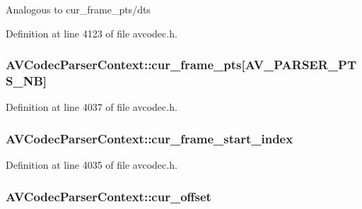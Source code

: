 Analogous to cur\+\_\+frame\+\_\+pts/dts 

Definition at line 4123 of file avcodec.\+h.

\subsubsection[{\texorpdfstring{cur\+\_\+frame\+\_\+pts}{cur_frame_pts}}]{ A\+V\+Codec\+Parser\+Context\+::cur\+\_\+frame\+\_\+pts\mbox{[}{\bf A\+V\+\_\+\+P\+A\+R\+S\+E\+R\+\_\+\+P\+T\+S\+\_\+\+NB}\mbox{]}}\hypertarget{struct_a_v_codec_parser_context_ab9dc35523fa27b36052b5ab984189ca2}{}\label{struct_a_v_codec_parser_context_ab9dc35523fa27b36052b5ab984189ca2}


Definition at line 4037 of file avcodec.\+h.

\subsubsection[{\texorpdfstring{cur\+\_\+frame\+\_\+start\+\_\+index}{cur_frame_start_index}}]{ A\+V\+Codec\+Parser\+Context\+::cur\+\_\+frame\+\_\+start\+\_\+index}\hypertarget{struct_a_v_codec_parser_context_ac4e6f9c9bd604bd9ff4d7a5035381557}{}\label{struct_a_v_codec_parser_context_ac4e6f9c9bd604bd9ff4d7a5035381557}


Definition at line 4035 of file avcodec.\+h.

\subsubsection[{\texorpdfstring{cur\+\_\+offset}{cur_offset}}]{ A\+V\+Codec\+Parser\+Context\+::cur\+\_\+offset}\hypertarget{struct_a_v_codec_parser_context_a03bee6c789b4ad1b8df27afd0658b0b1}{}\label{struct_a_v_codec_parser_context_a03bee6c789b4ad1b8df27afd0658b0b1}


